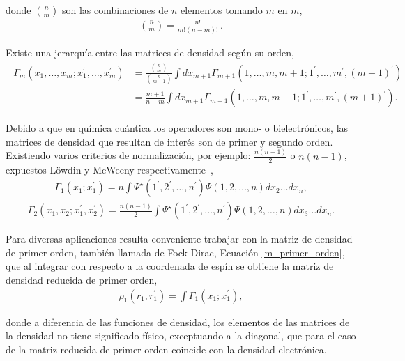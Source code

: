 \noindent donde ${n \choose m}$ son las combinaciones de $n$ elementos tomando $m$ en $m$,
%
\small
\begin{align}
  {n \choose m} = \frac{n!}{m! (n-m)!}\, .
\end{align}
\normalsize

Existe una jerarquía entre las matrices de densidad según su orden,
\small
\begin{align}
  \begin{split}
    \Gamma_{m}(x_{1}, \ldots , x_{m}; x^{\prime}_{1}, \ldots , x^{\prime}_{m}) & = \frac{{n \choose m}}{{n \choose {m+1}}}
    \int dx_{m+1}\Gamma_{m+1}(1, \ldots , m, m+1;1^{\prime}, \ldots , m^{\prime}, (m+1)^{\prime}) \\
	    & = \frac{m+1}{n-m} \int dx_{m+1}\Gamma_{m+1}(1, \ldots , m, m+1;1^{\prime}, \ldots , m^{\prime}, (m+1)^{\prime}).
  \end{split}
\end{align}
\normalsize

Debido a que en química cuántica los operadores son mono- o bielectrónicos, las
matrices de densidad que resultan de interés son de primer y segundo orden.
Existiendo varios criterios de normalización, por ejemplo: $\frac{n(n-1)}{2}$ o
$n(n-1)$, expuestos L\"owdin y McWeeny
respectivamente~\cite{Lwdin1955,mcweeny},
%
\begin{align}
  \Gamma_{1} (x_1;x_1^{\prime}) = n\int\Psi^{\star}(1^{\prime}, 2^{\prime}, \ldots ,n^{\prime})\Psi(1, 2, \ldots , n) dx_{2} \ldots dx_{n},
  \label{m_primer_orden}
\end{align}
\begin{align}
  \Gamma_{2} (x_{1}, x_{2};x^{\prime}_{1},x^{\prime}_{2}) = \frac{n(n-1)}{2} \int\Psi^{\star}(1^{\prime}, 2^{\prime}, \ldots ,n^{\prime})
  \Psi(1, 2, \ldots , n) dx_{3} \ldots dx_{n}.
\end{align}

Para diversas aplicaciones resulta conveniente trabajar con la matriz de
densidad de primer orden, también llamada de Fock-Dirac, Ecuación
\ref{m_primer_orden}, que al integrar con respecto a la coordenada de espín se
obtiene la matriz de densidad reducida de primer orden,
%
\begin{align}
  \rho_{1}(r_{1},r^{\prime}_{1}) = \int\Gamma_{1} (x_{1};x_{1}^{\prime}),
  \label{m_r_1}
\end{align}

\noindent donde a diferencia de las funciones de densidad, los elementos de las
matrices de la densidad no tiene significado físico, exceptuando a la diagonal,
que para el caso de la matriz reducida de primer orden coincide con la densidad
electrónica.

